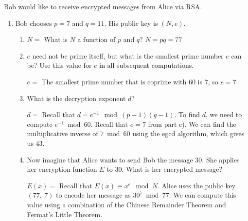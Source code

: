 \documentclass[11pt, preview]{standalone} %
\begin{document}
\noindent Bob would like to receive encrypted messages from Alice via RSA.
\begin{enumerate}
\item Bob chooses $p = 7$ and $q = 11$. His public key is $(N,e)$. 
\begin{enumerate}
\item \begin{Freeform}{77}
$N =$ 
\Hint What is $N$ a function of $p$ and $q$?
\Solution $N = pq = 77$
\end{Freeform}
\item $e$ need not be prime itself, but what is the smallest prime number $e$ can be? Use this value for $e$ in all subsequent computations.
\begin{Freeform}{7}
$ e = $
\Solution The smallest prime number that is coprime with $60$ is $7$, so $e = 7$
\end{Freeform}
\item What is the decryption exponent $d$?
\begin{Freeform}{43}
$d = $
\Hint Recall that $d = e^{-1} \mod (p-1)(q-1)$.
\Solution To find $d$, we need to compute $e^{-1} \bmod 60$. Recall that $e = 7$ from part c). We can find the multiplicative inverse of $7 \bmod 60$ using the egcd algorithm, which gives us $43$.  
\end{Freeform}
\item Now imagine that Alice wants to send Bob the message $30$. She applies her encryption function $E$ to $30$. What is her encrypted message?
\begin{Freeform}{2}
$E(x) = $
\Hint Recall that $E(x) \equiv x^e \mod N$.
\Solution Alice uses the public key $(77,\ 7)$ to encode her message as $30^{7} \bmod 77$. We can compute this value using a combination of the Chinese Remainder Theorem and Fermat's Little Theorem.\\


\end{Freeform}
\end{enumerate}
\end{enumerate}
\end{document}
